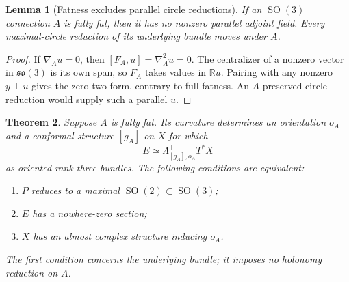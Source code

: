 \documentclass[11pt]{amsart}
\newcommand{\SO}{\operatorname{SO}}
\newcommand{\R}{\mathbb R}
\theoremstyle{plain}
\newtheorem{theorem}{Theorem}[section]
\newtheorem{lemma}[theorem]{Lemma}
\theoremstyle{definition}
\theoremstyle{remark}
\begin{document}
\begin{lemma}[Fatness excludes parallel circle reductions]\label{lem:no-parallel-fat}
If an $\SO(3)$ connection $A$ is fully fat, then it has no nonzero parallel adjoint field.  Every maximal-circle reduction of its underlying bundle moves under $A$.
\end{lemma}

\begin{proof}
If $\nabla_Au=0$, then $[F_A,u]=\nabla_A^2u=0$.  The centralizer of a nonzero vector in $\mathfrak{so}(3)$ is its own span, so $F_A$ takes values in $\R u$.  Pairing with any nonzero $y\perp u$ gives the zero two-form, contrary to full fatness.  An $A$-preserved circle reduction would supply such a parallel $u$.
\end{proof}

\begin{theorem}\label{thm:general}
Suppose $A$ is fully fat.  Its curvature determines an orientation
$o_A$ and a conformal structure $[g_A]$ on $X$ for which
\begin{equation}\label{eq:selfdual-identification}
 E\simeq\Lambda^+_{[g_A],o_A}T^*X
\end{equation}
as oriented rank-three bundles.  The following conditions are equivalent:
\begin{enumerate}
\item $P$ reduces to a maximal $\SO(2)\subset\SO(3)$;
\item $E$ has a nowhere-zero section;
\item $X$ has an almost complex structure inducing $o_A$.
\end{enumerate}
The first condition concerns the underlying bundle; it imposes no
holonomy reduction on $A$.
\end{theorem}
\end{document}
